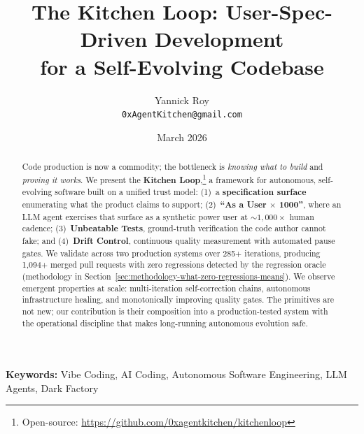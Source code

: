 \documentclass[11pt,a4paper]{article}
\title{The Kitchen Loop: User-Spec-Driven Development\\for a Self-Evolving Codebase}
\author{
  Yannick Roy\\
  \texttt{0xAgentKitchen@gmail.com}
}
\date{March 2026}
\begin{document}
\maketitle

\begin{abstract}
Code production is now a commodity; the bottleneck is \emph{knowing what to build} and \emph{proving it works}. We present the \textbf{Kitchen Loop},\footnote{Open-source: \url{https://github.com/0xagentkitchen/kitchenloop}} a framework for autonomous, self-evolving software built on a unified trust model: (1)~a \textbf{specification surface} enumerating what the product claims to support; (2)~\textbf{``As a User $\times$ 1000''}, where an LLM agent exercises that surface as a synthetic power user at ${\sim}1{,}000\times$ human cadence; (3)~\textbf{Unbeatable Tests}, ground-truth verification the code author cannot fake; and (4)~\textbf{Drift Control}, continuous quality measurement with automated pause gates. We validate across two production systems over 285+ iterations, producing 1,094+ merged pull requests with zero regressions detected by the regression oracle (methodology in Section~\ref{sec:methodology-what-zero-regressions-means}). We observe emergent properties at scale: multi-iteration self-correction chains, autonomous infrastructure healing, and monotonically improving quality gates. The primitives are not new; our contribution is their composition into a production-tested system with the operational discipline that makes long-running autonomous evolution safe.
\end{abstract}

\vspace{0.5em}
\noindent\textbf{Keywords:} Vibe Coding, AI Coding, Autonomous Software Engineering, LLM Agents, Dark Factory

\vspace{1em}
\end{document}
